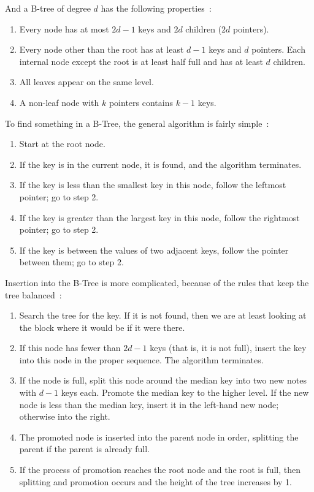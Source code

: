 And a B-tree of degree $d$ has the following properties~\cite{osi}:

\begin{enumerate}
	\item Every node has at most $2d-1$ keys and $2d$ children ($2d$ pointers).
	\item Every node other than the root has at least $d-1$ keys and $d$ pointers. Each internal node except the root is at least half full and has at least $d$ children.
	\item All leaves appear on the same level.
	\item A non-leaf node with $k$ pointers contains $k-1$ keys.
\end{enumerate}

To find something in a B-Tree, the general algorithm is fairly simple~\cite{osi}:

\begin{enumerate}
	\item Start at the root node. 
	\item If the key is in the current node, it is found, and the algorithm terminates.
	\item If the key is less than the smallest key in this node, follow the leftmost pointer; go to step 2.
	\item If the key is greater than the largest key in this node, follow the rightmost pointer; go to step 2.
	\item If the key is between the values of two adjacent keys, follow the pointer between them; go to step 2.
\end{enumerate}


Insertion into the B-Tree is more complicated, because of the rules that keep the tree balanced~\cite{osi}:

\begin{enumerate}
	\item Search the tree for the key. If it is not found, then we are at least looking at the block where it would be if it were there.
	\item If this node has fewer than $2d-1$ keys (that is, it is not full), insert the key into this node in the proper sequence. The algorithm terminates.
	\item If the node is full, split this node around the median key into two new notes with $d-1$ keys each. Promote the median key to the higher level. If the new node is less than the median key, insert it in the left-hand new node; otherwise into the right.
	\item The promoted node is inserted into the parent node in order, splitting the parent if the parent is already full.
	\item If the process of promotion reaches the root node and the root is full, then splitting and promotion occurs and the height of the tree increases by 1.
\end{enumerate}

